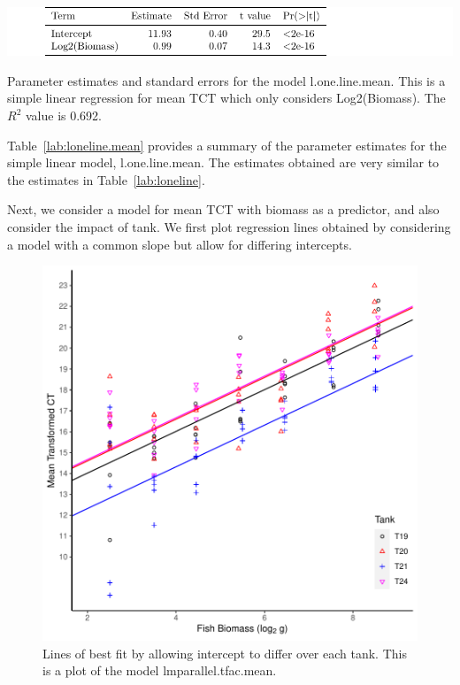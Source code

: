 \vspace{5mm}




\begin{table}[H]
\includegraphics{Chapter3Images/lmMeanCorrect.pdf}
\caption{ Parameter estimates and standard errors for the model l.one.line.mean. This is a simple linear regression for mean TCT which only considers Log2(Biomass). The $R^{2}$ value is 0.692.}
\label{lab:loneline.mean}
\end{table}








Table~\ref{lab:loneline.mean} provides a summary of the parameter estimates for the simple linear model, l.one.line.mean. The estimates obtained are very similar to the estimates in Table~\ref{lab:loneline}.

\newpage

Next, we consider a model for mean TCT with biomass as a predictor, and also consider the impact of tank. We first plot regression lines obtained by considering a model with a common slope but allow for differing intercepts.

\begin{figure}[H]
\includegraphics{Chapter3Images/parmean.pdf}
\caption{ Lines of best fit by allowing intercept to differ over each tank. This is a plot of the model lmparallel.tfac.mean.}
\label{fig:parmean}
\end{figure}









